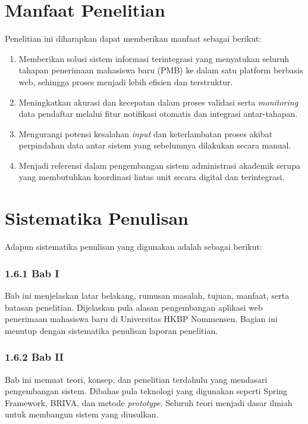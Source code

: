 \section{Manfaat Penelitian} \label{I.Manfaat}
Penelitian ini diharapkan dapat memberikan manfaat sebagai berikut:\par

\begin{enumerate}[noitemsep]
	\item Memberikan solusi sistem informasi terintegrasi yang menyatukan seluruh tahapan penerimaan mahasiswa baru (PMB) ke dalam satu platform berbasis web, sehingga proses menjadi lebih efisien dan terstruktur.
	\item Meningkatkan akurasi dan kecepatan dalam proses validasi serta \textit{monitoring} data pendaftar melalui fitur notifikasi otomatis dan integrasi antar-tahapan.
	\item Mengurangi potensi kesalahan \textit{input} dan keterlambatan proses akibat perpindahan data antar sistem yang sebelumnya dilakukan secara manual.
	\item Menjadi referensi dalam pengembangan sistem administrasi akademik serupa yang membutuhkan koordinasi lintas unit secara digital dan terintegrasi.
\end{enumerate}

\section{Sistematika Penulisan} \label{I.Sistematika}
Adapun sistematika penulisan yang digunakan adalah sebagai berikut:\par

\subsubsection*{1.6.1 Bab I}
Bab ini menjelaskan latar belakang, rumusan masalah, tujuan, manfaat, serta batasan penelitian. Dijelaskan pula alasan pengembangan aplikasi web penerimaan mahasiswa baru di Universitas HKBP Nommensen. Bagian ini menutup dengan sistematika penulisan laporan penelitian.\par

\subsubsection*{1.6.2 Bab II}
Bab ini memuat teori, konsep, dan penelitian terdahulu yang mendasari pengembangan sistem. Dibahas pula teknologi yang digunakan seperti Spring Framework, BRIVA, dan metode \textit{prototype}. Seluruh teori menjadi dasar ilmiah untuk membangun sistem yang diusulkan.\par

